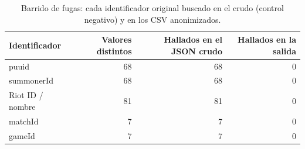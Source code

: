 \begin{table}[H]
\centering
\small
\caption{Barrido de fugas: cada identificador original buscado en el crudo (control negativo) y en los CSV anonimizados.}
\label{tab:barrido}
\begin{tabular}{lrrr}
\toprule
Identificador & Valores distintos & Hallados en el JSON crudo & Hallados en la salida \\
\midrule
puuid & 68 & 68 & 0 \\
summonerId & 68 & 68 & 0 \\
Riot ID / nombre & 81 & 81 & 0 \\
matchId & 7 & 7 & 0 \\
gameId & 7 & 7 & 0 \\
\bottomrule
\end{tabular}
\end{table}
